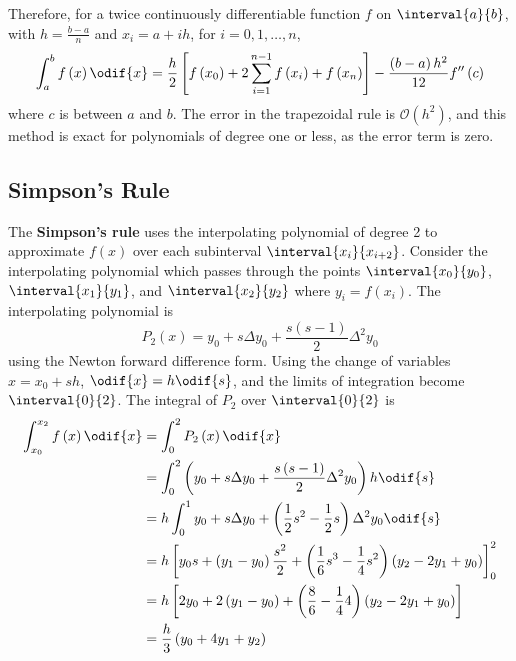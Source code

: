 \documentclass{article}
\begin{document}
Therefore, for a twice continuously differentiable function \(f\) on \(\interval{a}{b}\), with \(h = \frac{b - a}{n}\) and \(x_i = a + i h\), for \(i = 0, 1, \ldots, n\),
\begin{equation*}
    \int_a^b f\left( x \right) \odif{x} = \frac{h}{2} \left[ f\left( x_0 \right) + 2 \sum_{i = 1}^{n - 1} f\left( x_i \right) + f\left( x_n \right) \right] - \frac{\left( b - a \right) h^2}{12} f''\left( c \right)
\end{equation*}
where \(c\) is between \(a\) and \(b\). The error in the trapezoidal rule is \(\mathcal{O}\left( h^2 \right)\), and this method is exact for polynomials of degree one or less, as the error term is zero.
\subsection{Simpson's Rule}
The \textbf{Simpson's rule} uses the interpolating polynomial of degree 2 to approximate \(f\left( x \right)\) over each subinterval \(\interval{x_i}{x_{i + 2}}\).
Consider the interpolating polynomial which passes through the points \(\interval{x_0}{y_0}\), \(\interval{x_1}{y_1}\), and \(\interval{x_2}{y_2}\) where
\(y_i = f\left( x_i \right)\). The interpolating polynomial is
\begin{equation*}
    P_2\left( x \right) = y_0 + s \Delta{y_0} + \frac{s\left( s - 1 \right)}{2} \Delta^2{y_0}
\end{equation*}
using the Newton forward difference form. Using the change of variables \(x = x_0 + s h\), \(\odif{x} = h \odif{s}\), and the limits of integration become \(\interval{0}{2}\).
The integral of \(P_2\) over \(\interval{0}{2}\) is
\begin{align*}
    \int_{x_0}^{x_2} f\left( x \right) \odif{x} & = \int_0^2 P_2\left( x \right) \odif{x}                                                                                                                  \\
                                                & = \int_0^2 \left( y_0 + s \Delta{y_0} + \frac{s\left( s - 1 \right)}{2} \Delta^2{y_0} \right) h \odif{s}                                                 \\
                                                & = h \int_0^1 y_0 + s \Delta{y_0} + \left( \frac{1}{2} s^2 - \frac{1}{2} s \right) \Delta^2{y_0} \odif{s}                                                 \\
                                                & = h \left[ y_0 s + \left( y_1 - y_0 \right) \frac{s^2}{2} + \left( \frac{1}{6} s^3 - \frac{1}{4} s^2 \right) \left( y_2 - 2y_1 + y_0 \right) \right]_0^2 \\
                                                & = h \left[ 2 y_0 + 2 \left( y_1 - y_0 \right) + \left( \frac{8}{6} - \frac{1}{4} 4 \right) \left( y_2 - 2y_1 + y_0 \right) \right]                       \\
                                                & = \frac{h}{3} \left( y_0 + 4 y_1 + y_2 \right)
\end{align*}
\end{document}
